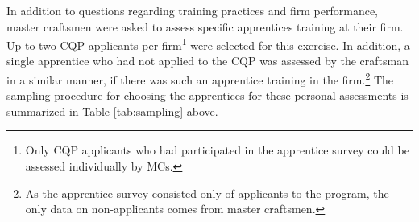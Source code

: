 \documentclass[
  a4paper, twoside, 12pt]{book}
\begin{document}
In addition to questions regarding training practices and firm performance, master craftsmen were asked to assess specific apprentices training at their firm. Up to two CQP applicants per firm\footnote{Only CQP applicants who had participated in the apprentice survey could be assessed individually by MCs.} were selected for this exercise. In addition, a single apprentice who had not applied to the CQP was assessed by the craftsman in a similar manner, if there was such an apprentice training in the firm.\footnote{As the apprentice survey consisted only of applicants to the program, the only data on non-applicants comes from master craftsmen.} The sampling procedure for choosing the apprentices for these personal assessments is summarized in Table \ref{tab:sampling} above.

\singlespacing
\end{document}
